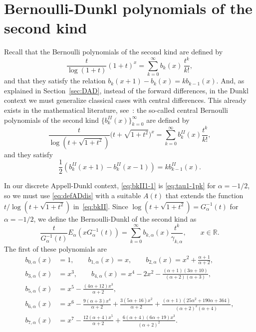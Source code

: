 \documentclass[11pt]{article}
\theoremstyle{plain}
\theoremstyle{remark}
\numberwithin{equation}{section} %
\newcommand{\Ea}{E_{\alpha}}
\newcommand{\RR}{\mathbb{R}}
\newcommand{\cc}{\gamma}
\begin{document}
\section{Bernoulli-Dunkl polynomials of the second kind}
\label{sec:BDsecond}

Recall that the Bernoulli polynomials of the second kind are defined by
\begin{equation*}
  \frac{t}{\log(1+t)}(1+t)^x = \sum_{k=0}^\infty b_k(x) \, \frac{t^k}{k!},
\end{equation*}
and that they satisfy the relation $b_k(x+1) - b_k(x) = k b_{k-1}(x)$. 
And, as explained in Section~\ref{sec:DAD}, instead of the forward differences, in the Dunkl context we must generalize classical cases with central differences. This already exists in the mathematical literature, see~\cite[\S\,6]{Tem}: the so-called central Bernoulli polynomials of the second kind $\{b_k^{\mathit{II}}(x)\}_{k=0}^{\infty}$ are defined by
\begin{equation}
\label{eq:bkII}
  \frac{t}{\log(t+\sqrt{1+t^2})} \big(t+\sqrt{1+t^2}\big)^x 
  = \sum_{k=0}^{\infty} b_k^{\mathit{II}}(x) \frac{t^k}{k!},
\end{equation}
and they satisfy 
\begin{equation}
\label{eq:bkII1-1}
  \frac{1}{2}(b_k^{\mathit{II}}(x+1) - b_k^{\mathit{II}}(x-1)) = k b_{k-1}^{\mathit{II}}(x).
\end{equation}

In our discrete Appell-Dunkl context, \eqref{eq:bkII1-1} is \eqref{eq:tau1-1pk} for $\alpha=-1/2$, so we must use \eqref{eq:defADdis} with a suitable $A(t)$ that extends the function $t/\log(t+\sqrt{1+t^2})$ in~\eqref{eq:bkII}. 
Since $\log(t+\sqrt{1+t^2}) = G_{\alpha}^{-1}(t)$ for $\alpha=-1/2$, we define the 
Bernoulli-Dunkl of the second kind as
\begin{equation}
\label{eq:bka}
  \frac{t}{G_{\alpha}^{-1}(t)} \Ea(x G_{\alpha}^{-1}(t)) 
  = \sum_{k=0}^{\infty} b_{k,\alpha}(x) \frac{t^k}{\cc_{k,\alpha}}, 
  \qquad x \in \RR.
\end{equation}
The first of these polynomials are
\begin{align*}
b_{0,\alpha}(x) &= 1, \qquad
b_{1,\alpha}(x) = x, \qquad
b_{2,\alpha}(x) = x^2 + \frac{\alpha+1}{\alpha+2}, \\
b_{3,\alpha}(x) &= x^3, \qquad
b_{4,\alpha}(x) = x^4 - 2 x^2
  - \frac{(\alpha+1)(3\alpha+10)}{(\alpha+2)(\alpha+3)}, \\
b_{5,\alpha}(x) &= x^5 - \frac{(4\alpha+12)x^3}{\alpha+2}, \\
b_{6,\alpha}(x) &= x^6
  - \frac{9(\alpha+3)x^4}{\alpha+2}
  + \frac{3(5\alpha+16) x^2}{\alpha+2}
  + \frac{(\alpha+1)(25\alpha^2+190\alpha+364)}{(\alpha+2)^2 (\alpha+4)}, \\
b_{7,\alpha}(x) &= x^7
  - \frac{12(\alpha+4)x^5}{\alpha+2}
  + \frac{6(\alpha+4)(6\alpha+19) x^3}{(\alpha+2)^2}.
\end{align*}
\end{document}
